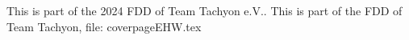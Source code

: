 This is part of the 2024 FDD of Team Tachyon e.V..
This is part of the FDD of Team Tachyon, file: coverpageEHW.tex
